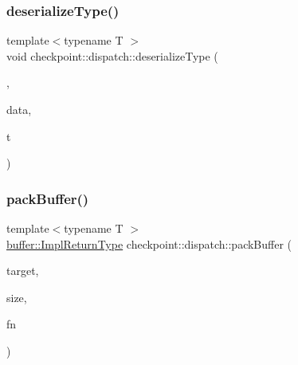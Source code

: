 \subsubsection{\texorpdfstring{deserialize\+Type()}{deserializeType()}\hspace{0.1cm}{\footnotesize\ttfamily [2/2]}}
{\footnotesize\ttfamily template$<$typename T $>$ \\
void checkpoint\+::dispatch\+::deserialize\+Type (\begin{DoxyParamCaption}\item[{\hyperlink{structcheckpoint_1_1dispatch_1_1_in_place_tag}{In\+Place\+Tag}}]{,  }\item[{\hyperlink{namespacecheckpoint_ae57f01cdc0b81776c23b6c7c934c58f5}{Serial\+Byte\+Type} $\ast$}]{data,  }\item[{T $\ast$}]{t }\end{DoxyParamCaption})}

\mbox{\label{namespacecheckpoint_1_1dispatch_aca3c0f09e49b43fb6f3d82fe39e89295}} 
\subsubsection{\texorpdfstring{pack\+Buffer()}{packBuffer()}}
{\footnotesize\ttfamily template$<$typename T $>$ \\
\hyperlink{namespacecheckpoint_1_1buffer_a4e930737a23dabd17333a8ea48c8edff}{buffer\+::\+Impl\+Return\+Type} checkpoint\+::dispatch\+::pack\+Buffer (\begin{DoxyParamCaption}\item[{T \&}]{target,  }\item[{\hyperlink{namespacecheckpoint_a083f6674da3f94c2901b18c6d238217c}{Serial\+Size\+Type}}]{size,  }\item[{\hyperlink{namespacecheckpoint_a8a2558a1dd0db386339dd81c193b7f10}{Buffer\+Obtain\+Fn\+Type}}]{fn }\end{DoxyParamCaption})}

\mbox{\label{namespacecheckpoint_1_1dispatch_a055fa8c0078dbd129325b1038079d87d}} 

